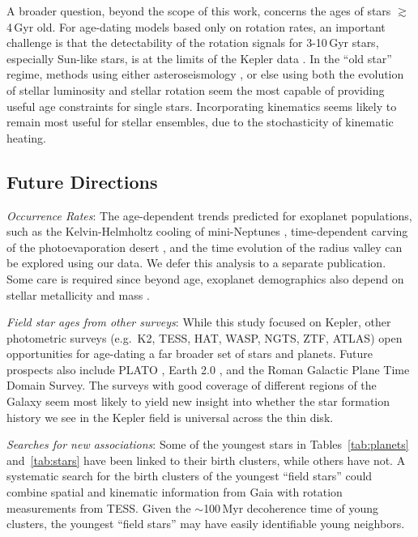 \documentclass[11pt,twocolumn,tighten]{aastex63}
\begin{document}
A broader question, beyond the scope of this work, concerns the ages
of stars $\gtrsim$4\,Gyr old.  For age-dating models based only on
rotation rates, an important challenge is that the detectability of
the rotation signals for 3-10\,Gyr stars, especially Sun-like stars,
is at the limits of the Kepler data \citep{2022ApJ...937...94M}.  In
the ``old star'' regime, methods using either asteroseismology
\citep{vanSaders_2016,2024ApJ...962..138S}, or else using both the
evolution of stellar luminosity and stellar rotation
\citep{Angus_2019,Claytor2020,2023ApJ...952..131M} seem the most capable of
providing useful age constraints for single stars.  Incorporating
kinematics \citep{2021AJ....161..189L} seems likely to remain most
useful for stellar ensembles, due to the stochasticity of kinematic
heating.


\subsection{Future Directions}

{\it Occurrence Rates}:
The age-dependent trends predicted for exoplanet populations, such as
the Kelvin-Helmholtz cooling of mini-Neptunes \citep{Gupta_2019},
time-dependent carving of the photoevaporation desert
\citep{Owen2018}, and the time evolution of the radius valley
\citep{Rogers_2021} can be explored using our data.  We defer this
analysis to a separate publication.
Some care is required since beyond age,
exoplanet demographics also depend on stellar metallicity and mass
\citep[e.g.][]{Petigura_2018,Miyazaki2023}.  

{\it Field star ages from other surveys}:
While this study focused on
Kepler, other photometric surveys (e.g.~K2, TESS, HAT, WASP, NGTS, ZTF,
ATLAS) open opportunities for age-dating a far broader set
of stars and planets.
Future prospects also include PLATO
\citep{Rauer14}, Earth 2.0 \citep{2022arXiv220606693G}, and the Roman
Galactic Plane Time Domain Survey.
The surveys with good coverage of different regions of the Galaxy seem
most likely to yield new insight into whether the star formation
history we see in the Kepler field is universal across the thin disk.

{\it Searches for new associations}:
Some of the youngest stars in Tables~\ref{tab:planets}
and~\ref{tab:stars} have been linked to their birth clusters, while
others have not. A systematic search for the birth clusters of the
youngest ``field stars'' could combine spatial and kinematic
information from Gaia with rotation measurements from TESS. Given the
$\sim$100\,Myr decoherence time of young clusters, the youngest ``field
stars'' may have easily identifiable young neighbors.
\end{document}
